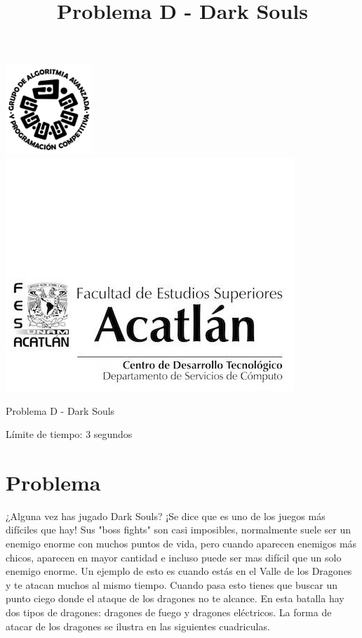 \documentclass[letter,10pt]{article}
\date{}
\begin{document}
\title{Problema D - Dark Souls}

\includegraphics[scale=0.6]{logo} \hspace*{9.00cm}
\includegraphics[scale=0.5]{dsc} 
\bigskip
\begin{center}
	\Large Problema D - Dark Souls
\end{center}

\begin{flushright}
Límite de tiempo: 3 segundos
\par\end{flushright}
\bigskip

\section*{Problema}

¿Alguna vez has jugado Dark Souls? ¡Se dice que es uno de los juegos más difíciles que hay!
Sus "boss fights" son casi imposibles, normalmente suele ser un enemigo enorme con muchos puntos de vida, pero cuando aparecen enemigos más chicos, aparecen en mayor cantidad e incluso puede ser mas difícil que un solo enemigo enorme. Un ejemplo de esto es cuando estás en el Valle de los Dragones y te atacan muchos al mismo tiempo. Cuando pasa esto tienes que buscar un punto ciego donde el ataque de los dragones no te alcance. En esta batalla hay dos tipos de dragones: dragones de fuego y dragones eléctricos. La forma de atacar de los dragones se ilustra en las siguientes cuadriculas.
\end{document}
